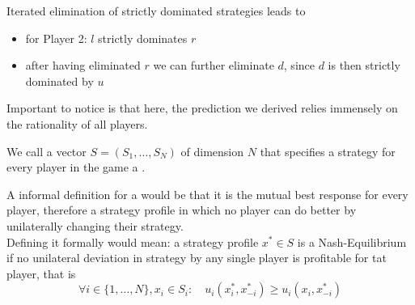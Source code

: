 \begin{example}
	Iterated elimination of strictly dominated strategies leads to
	\begin{itemize}
		\item for Player 2: $l$ strictly dominates $r$
		\item after having eliminated $r$ we can further eliminate $d$, since $d$ is then strictly dominated by $u$
	\end{itemize}
\end{example}

Important to notice is that here, the prediction we derived relies immensely on the rationality of all players.

\begin{definition} \label{strategyprofile}
	We call a vector $S = (S_{1}, \dotsc, S_{N})$ of dimension $N$ that specifies a strategy for every player in the game a .
\end{definition}

\begin{definition} \label{nashequilibrium}
	A informal definition for a  would be that it is the mutual best response for every player, therefore a strategy profile in which no player can do better by unilaterally changing their strategy. \\
	Defining it formally would mean: a strategy profile $x^{*} \in S$ is a Nash-Equilibrium if no unilateral deviation in strategy by any single player is profitable for tat player, that is
	\[ \forall i \in \{1, \dotsc, N \}, x_{i} \in S_{i}: \quad u_{i}(x_{i}^{*}, x_{-i}^{*}) \geq u_{i}(x_{i}, x_{-i}^{*}) \]
	\end{definition}

